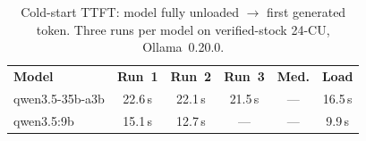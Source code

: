 \begin{table}[t]
\caption{Cold-start TTFT: model fully unloaded $\to$ first generated
token.  Three runs per model on verified-stock 24-CU,
Ollama~0.20.0.}\label{tab:cold_start}
\centering
\scriptsize
\begin{tabular}{@{}lccccc@{}}
\toprule
\textbf{Model} & \textbf{Run~1} & \textbf{Run~2} & \textbf{Run~3} & \textbf{Med.} & \textbf{Load} \\
\otoprule
qwen3.5-35b-a3b & 22.6\,s & 22.1\,s & 21.5\,s & --- & 16.5\,s \\
qwen3.5\!:\!9b & 15.1\,s & 12.7\,s & --- & --- & 9.9\,s \\
\bottomrule
\end{tabular}
\end{table}
